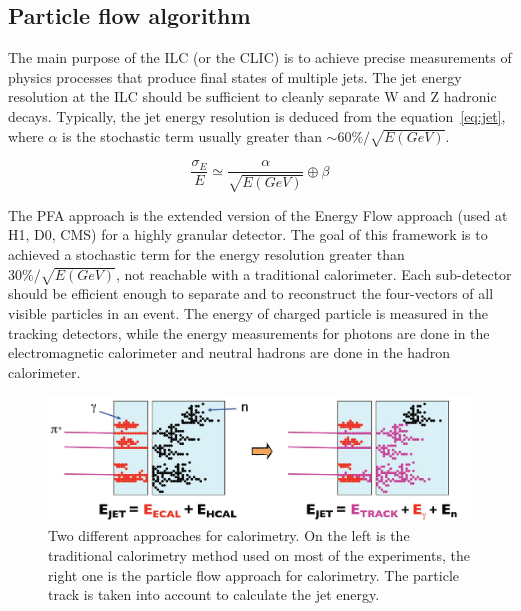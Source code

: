     \subsection{Particle flow algorithm}
    \label{subsec:PFA}

    The main purpose of the \gls{ILC} (or the \gls{CLIC}) is to achieve precise measurements of physics processes that produce final states of multiple jets.
    The jet energy resolution at the \gls{ILC} should be sufficient to cleanly separate W and Z hadronic decays.
    Typically, the jet energy resolution is deduced from the equation~\ref{eq:jet}, where $\alpha$ is the stochastic term usually greater than $\sim 60 \% / \sqrt{E(GeV)}$.

    \begin{equation}
      \frac{\sigma_E}{E} \simeq \frac{\alpha}{\sqrt{E(GeV)}} \oplus \beta
      \label{eq:jet}
    \end{equation}

    The \gls{PFA} approach is the extended version of the Energy Flow approach (used at H1, D0, CMS) for a highly granular detector. 
    The goal of this framework is to achieved a stochastic term for the energy resolution greater than $30 \% / \sqrt{E(GeV)}$, not reachable with a traditional calorimeter.
    Each sub-detector should be efficient enough to separate and to reconstruct the four-vectors of all visible particles in an event.
    The energy of charged particle is measured in the tracking detectors, while the energy measurements for photons are done in the electromagnetic calorimeter and neutral hadrons are done in the hadron calorimeter.
     
     \begin{figure}[!h]
      \centering
      \includegraphics[width = 15cm]{Pictures/ILC/physics.jpg}
      \caption{Two different approaches for calorimetry. On the left is the traditional calorimetry method used on most of the experiments, the right one is the particle flow approach for calorimetry. The particle track is taken into account to calculate the jet energy.\cite{PFA} }
      \label{fig:jetEnergy}
    \end{figure}   
    
